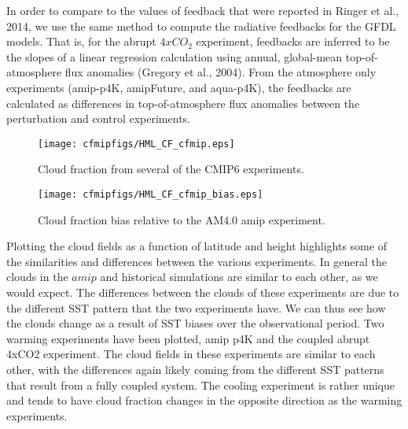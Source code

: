 \documentclass[11pt]{article}   	%
\begin{document}
In order to compare to the values of feedback that were reported in Ringer et al., 2014, we use the same method 
to compute the radiative feedbacks for the GFDL models.  That is, for the abrupt $4xCO_{2}$ experiment, feedbacks are 
inferred to be the slopes of a linear regression calculation using annual, global-mean top-of-atmosphere flux anomalies 
(Gregory et al., 2004).  From the atmosphere only experiments (amip-p4K, amipFuture, and aqua-p4K), the feedbacks 
are calculated as 
differences in top-of-atmosphere flux anomalies between the perturbation and control experiments.   

\begin{figure}
  \texttt{[image: cfmipfigs/HML\_CF\_cfmip.eps]}
  \caption{Cloud fraction from several of the CMIP6 experiments.}
  \label{fig:cf_hml_manyexps}
\end{figure}

\begin{figure}
  \texttt{[image: cfmipfigs/HML\_CF\_cfmip\_bias.eps]}
  \caption{Cloud fraction bias relative to the AM4.0 amip experiment.}
  \label{fig:cf_hml_bias}
\end{figure}


Plotting the cloud fields as a function of latitude and height highlights some of the similarities and differences 
between the various experiments.  In general the clouds in the $amip$ and historical simulations are similar to 
each other, as we would expect.  The differences between the clouds of these experiments are due to the 
different SST pattern that the two experiments have.  We can thus see how the clouds change as a result 
of SST biases over the observational period.  Two warming experiments have been plotted, amip p4K and 
the coupled abrupt 4xCO2 experiment.  The cloud fields in these experiments are similar to each other, with 
the differences again likely coming from the different SST patterns that result from a fully coupled system.  The 
cooling experiment is rather unique and tends to have cloud fraction changes in the opposite direction as 
the warming experiments.    

%
\end{document}
